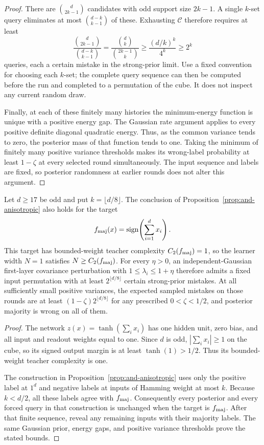 \begin{proof}
There are $\binom d{2k-1}$ candidates with odd support size $2k-1$.
A single $k$-set query eliminates at most
$\binom{d-k}{k-1}$ of these. Exhausting $\mathcal C$ therefore
requires at least
\[
 \frac{\binom d{2k-1}}{\binom{d-k}{k-1}}
 =\frac{\binom d k}{\binom{2k-1}k}
 \ge\frac{(d/k)^k}{4^k}\ge2^k
\]
queries, each a certain mistake in the strong-prior limit.
Use a fixed convention for choosing each $k$-set; the complete query
sequence can then be computed before the run and completed to a
permutation of the cube. It does not inspect any current random draw.

Finally, at each of these finitely many histories the minimum-energy
function is unique with a positive energy gap. The Gaussian rate
argument applies to every positive definite diagonal quadratic energy.
Thus, as the common variance tends to zero, the posterior mass of that
function tends to one. Taking the minimum of finitely many positive
variance thresholds makes its wrong-label probability at least
$1-\zeta$ at every selected round simultaneously. The input sequence
and labels are fixed, so posterior randomness at earlier rounds does
not alter this argument.
\end{proof}

\begin{corollary}
\label{cor:majority-anisotropic}
Let $d\ge17$ be odd and put $k=\lfloor d/8\rfloor$. The conclusion
of Proposition~\ref{prop:and-anisotropic} also holds for the target
\[
 f_{\rm maj}(x)=\operatorname{sign}\!\left(\sum_{i=1}^d x_i\right).
\]
This target has bounded-weight teacher complexity $C_2(f_{\rm maj})=1$,
so the learner width $N=1$ satisfies $N\ge C_2(f_{\rm maj})$.
For every $\eta>0$, an independent-Gaussian first-layer covariance
perturbation with $1\le\lambda_i\le1+\eta$ therefore admits a fixed
input permutation with at least $2^{\lfloor d/8\rfloor}$ certain
strong-prior mistakes. At all sufficiently small positive variances,
the expected sampled mistakes on those rounds are at least
$(1-\zeta)2^{\lfloor d/8\rfloor}$ for any prescribed
$0<\zeta<1/2$, and posterior majority is wrong on all of them.
\end{corollary}
\begin{proof}
The network $z(x)=\tanh(\sum_i x_i)$ has one hidden unit, zero bias,
and all input and readout weights equal to one. Since $d$ is odd,
$|\sum_i x_i|\ge1$ on the cube, so its signed output margin is at
least $\tanh(1)>1/2$. Thus its bounded-weight teacher complexity is
one.

The construction in Proposition~\ref{prop:and-anisotropic} uses only
the positive label at $1^d$ and negative labels at inputs of Hamming
weight at most $k$. Because $k<d/2$, all these labels agree with
$f_{\rm maj}$. Consequently every posterior and every forced query
in that construction is unchanged when the target is $f_{\rm maj}$.
After that finite sequence, reveal any remaining inputs with their
majority labels. The same Gaussian prior, energy gaps, and positive
variance thresholds prove the stated bounds.
\end{proof}

